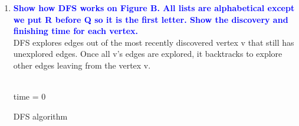 \documentclass[11pt]{article}
\begin{document}
\begin{enumerate}
\item \textbf{\textcolor{blue}{Show how DFS works on Figure B. All lists are alphabetical except we put R before Q so it is the first letter. Show the discovery and finishing time for each vertex.}}
    \\ DFS explores edges out of the most recently discovered vertex v that still has unexplored edges. Once all v's edges are explored, it backtracks to explore other edges leaving from the vertex v.
    \begin{algorithm}
    \Indm{}\\
    \Indp
        time = 0 \\
    \caption{DFS algorithm}
    \end{algorithm}
    

\end{enumerate}
\end{document}
